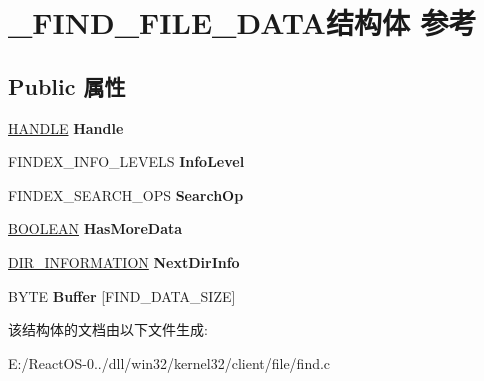\hypertarget{struct___f_i_n_d___f_i_l_e___d_a_t_a}{}\section{\+\_\+\+F\+I\+N\+D\+\_\+\+F\+I\+L\+E\+\_\+\+D\+A\+T\+A结构体 参考}
\label{struct___f_i_n_d___f_i_l_e___d_a_t_a}
\subsection*{Public 属性}
\begin{DoxyCompactItemize}
\item 
\mbox{\label{struct___f_i_n_d___f_i_l_e___d_a_t_a_a0ecc8338b2e1b1dcaf76232ec448a8b5}} 
\hyperlink{interfacevoid}{H\+A\+N\+D\+LE} {\bfseries Handle}
\item 
\mbox{\label{struct___f_i_n_d___f_i_l_e___d_a_t_a_a0342e7b6f4545d9484d69db06840e7d0}} 
F\+I\+N\+D\+E\+X\+\_\+\+I\+N\+F\+O\+\_\+\+L\+E\+V\+E\+LS {\bfseries Info\+Level}
\item 
\mbox{\label{struct___f_i_n_d___f_i_l_e___d_a_t_a_a0c1ddb4045137d468bab82f99b1cb048}} 
F\+I\+N\+D\+E\+X\+\_\+\+S\+E\+A\+R\+C\+H\+\_\+\+O\+PS {\bfseries Search\+Op}
\item 
\mbox{\label{struct___f_i_n_d___f_i_l_e___d_a_t_a_aa01af944390a44414863ec600a4845f6}} 
\hyperlink{_processor_bind_8h_a112e3146cb38b6ee95e64d85842e380a}{B\+O\+O\+L\+E\+AN} {\bfseries Has\+More\+Data}
\item 
\mbox{\label{struct___f_i_n_d___f_i_l_e___d_a_t_a_a6c495a558665247fdfb12e27b59925e4}} 
\hyperlink{union___d_i_r___i_n_f_o_r_m_a_t_i_o_n}{D\+I\+R\+\_\+\+I\+N\+F\+O\+R\+M\+A\+T\+I\+ON} {\bfseries Next\+Dir\+Info}
\item 
\mbox{\label{struct___f_i_n_d___f_i_l_e___d_a_t_a_ae7480c0c4c681b44540f9c76a56c9033}} 
B\+Y\+TE {\bfseries Buffer} \mbox{[}F\+I\+N\+D\+\_\+\+D\+A\+T\+A\+\_\+\+S\+I\+ZE\mbox{]}
\end{DoxyCompactItemize}


该结构体的文档由以下文件生成\+:\begin{DoxyCompactItemize}
\item 
E\+:/\+React\+O\+S-\/0../dll/win32/kernel32/client/file/find.\+c\end{DoxyCompactItemize}
